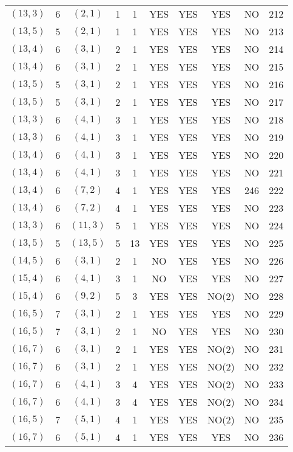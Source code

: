\begin{longtable}{|c|c|c|c|c|c|c|c|c|c|}
$(13, 3)$ & 6 & $(2, 1)$ & 1 & 1 & YES & YES & YES & NO & 212\\
$(13, 5)$ & 5 & $(2, 1)$ & 1 & 1 & YES & YES & YES & NO & 213\\
$(13, 4)$ & 6 & $(3, 1)$ & 2 & 1 & YES & YES & YES & NO & 214\\
$(13, 4)$ & 6 & $(3, 1)$ & 2 & 1 & YES & YES & YES & NO & 215\\
$(13, 5)$ & 5 & $(3, 1)$ & 2 & 1 & YES & YES & YES & NO & 216\\
$(13, 5)$ & 5 & $(3, 1)$ & 2 & 1 & YES & YES & YES & NO & 217\\
$(13, 3)$ & 6 & $(4, 1)$ & 3 & 1 & YES & YES & YES & NO & 218\\
$(13, 3)$ & 6 & $(4, 1)$ & 3 & 1 & YES & YES & YES & NO & 219\\
$(13, 4)$ & 6 & $(4, 1)$ & 3 & 1 & YES & YES & YES & NO & 220\\
$(13, 4)$ & 6 & $(4, 1)$ & 3 & 1 & YES & YES & YES & NO & 221\\
$(13, 4)$ & 6 & $(7, 2)$ & 4 & 1 & YES & YES & YES & 246 & 222\\
$(13, 4)$ & 6 & $(7, 2)$ & 4 & 1 & YES & YES & YES & NO & 223\\
$(13, 3)$ & 6 & $(11, 3)$ & 5 & 1 & YES & YES & YES & NO & 224\\
$(13, 5)$ & 5 & $(13, 5)$ & 5 & 13 & YES & YES & YES & NO & 225\\
$(14, 5)$ & 6 & $(3, 1)$ & 2 & 1 & NO & YES & YES & NO & 226\\
$(15, 4)$ & 6 & $(4, 1)$ & 3 & 1 & NO & YES & YES & NO & 227\\
$(15, 4)$ & 6 & $(9, 2)$ & 5 & 3 & YES & YES & NO(2) & NO & 228\\
$(16, 5)$ & 7 & $(3, 1)$ & 2 & 1 & YES & YES & YES & NO & 229\\
$(16, 5)$ & 7 & $(3, 1)$ & 2 & 1 & NO & YES & YES & NO & 230\\
$(16, 7)$ & 6 & $(3, 1)$ & 2 & 1 & YES & YES & NO(2) & NO & 231\\
$(16, 7)$ & 6 & $(3, 1)$ & 2 & 1 & YES & YES & NO(2) & NO & 232\\
$(16, 7)$ & 6 & $(4, 1)$ & 3 & 4 & YES & YES & NO(2) & NO & 233\\
$(16, 7)$ & 6 & $(4, 1)$ & 3 & 4 & YES & YES & NO(2) & NO & 234\\
$(16, 5)$ & 7 & $(5, 1)$ & 4 & 1 & YES & YES & NO(2) & NO & 235\\
$(16, 7)$ & 6 & $(5, 1)$ & 4 & 1 & YES & YES & YES & NO & 236\\

\end{longtable}
